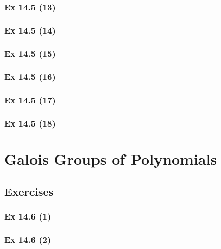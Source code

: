 \subsubsection{Ex 14.5 (13)}\label{sec:Ex_14.5.13}

\subsubsection{Ex 14.5 (14)}\label{sec:Ex_14.5.14}

\subsubsection{Ex 14.5 (15)}\label{sec:Ex_14.5.15}

\subsubsection{Ex 14.5 (16)}\label{sec:Ex_14.5.16}

\subsubsection{Ex 14.5 (17)}\label{sec:Ex_14.5.17}

\subsubsection{Ex 14.5 (18)}\label{sec:Ex_14.5.18}

\newpage		%

\section{Galois Groups of Polynomials}\label{sec:14.6}	
\subsection*{Exercises}\label{sec:14.6_Exercises}

\subsubsection{Ex 14.6 (1)}\label{sec:Ex_14.6.1}

\subsubsection{Ex 14.6 (2)}\label{sec:Ex_14.6.2}

